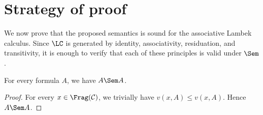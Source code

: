 \section{Strategy of proof}
We now prove that the proposed semantics is sound for the associative Lambek calculus. Since
$\LC$ is generated by identity, associativity, residuation, and transitivity, it is enough to verify
that each of these principles is valid under $\Sem$.

\begin{theorem}[Identity]
For every formula $A$, we have $A \Sem A$.
\end{theorem}

\begin{proof}
For every $x \in \Frag(\mathcal C)$, we trivially have $v(x,A) \leq v(x,A)$. Hence $A \Sem A$.
\end{proof}

